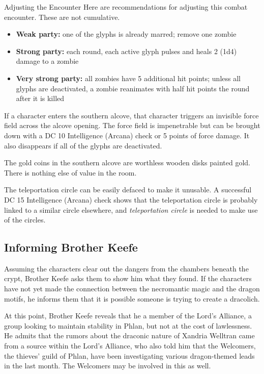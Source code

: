 \documentclass[10pt,a4paper,twoside,bg=print,twocolumn,openany,nodeprecatedcode]{dndbook}
\begin{document}
\begin{DndSidebar}[float=!b]{Adjusting the Encounter}
Here are recommendations for adjusting this combat encounter. These are not cumulative.




\begin{itemize}
\item \textbf{Weak party:} one of the glyphs is already marred; remove one zombie
\item \textbf{Strong party:} each round, each active glyph pulses and heals 2 (1d4) damage to a zombie
\item \textbf{Very strong party:} all zombies have 5 additional hit points; unless all glyphs are deactivated, a zombie reanimates with half hit points the round after it is killed
\end{itemize}



\end{DndSidebar}

If a character enters the southern alcove, that character triggers an invisible force field across the alcove opening. The force field is impenetrable but can be brought down with a DC 10 Intelligence (Arcana) check or 5 points of force damage. It also disappears if all of the glyphs are deactivated.

The gold coins in the southern alcove are worthless wooden disks painted gold. There is nothing else of value in the room.

The teleportation circle can be easily defaced to make it unusable. A successful DC 15 Intelligence (Arcana) check shows that the teleportation circle is probably linked to a similar circle elsewhere, and \textit{teleportation circle} is needed to make use of the circles.

\subsection{Informing Brother Keefe}
Assuming the characters clear out the dangers from the chambers beneath the crypt, Brother Keefe asks them to show him what they found. If the characters have not yet made the connection between the necromantic magic and the dragon motifs, he informs them that it is possible someone is trying to create a dracolich.

At this point, Brother Keefe reveals that he a member of the Lord's Alliance, a group looking to maintain stability in Phlan, but not at the cost of lawlessness. He admits that the rumors about the draconic nature of Xandria Welltran came from a source within the Lord's Alliance, who also told him that the Welcomers, the thieves' guild of Phlan, have been investigating various dragon-themed leads in the last month. The Welcomers may be involved in this as well.
\end{document}
